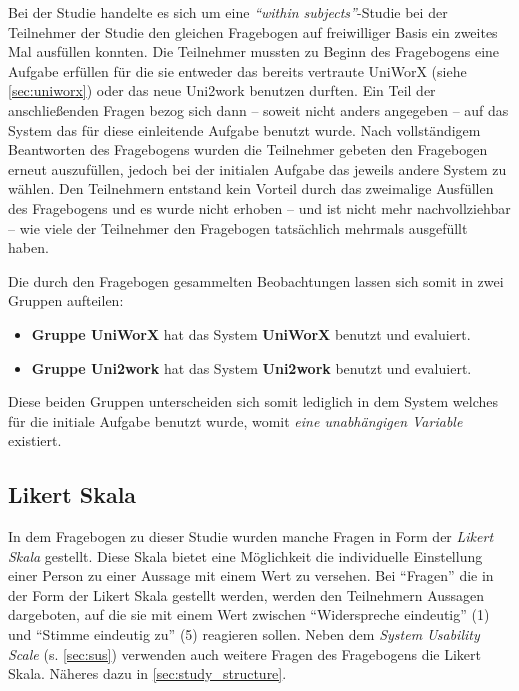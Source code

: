 \documentclass[11pt,a4paper,twoside,ngerman]{article}
\begin{document}
Bei der Studie handelte es sich um eine \emph{"`within subjects"'}-Studie bei der Teilnehmer der Studie den gleichen Fragebogen auf freiwilliger Basis ein zweites Mal ausfüllen konnten. Die Teilnehmer mussten zu Beginn des Fragebogens eine Aufgabe erfüllen für die sie entweder das bereits vertraute UniWorX (siehe \autoref{sec:uniworx}) oder das neue Uni2work benutzen durften. Ein Teil der anschließenden Fragen bezog sich dann -- soweit nicht anders angegeben -- auf das System das für diese einleitende Aufgabe benutzt wurde. Nach vollständigem Beantworten des Fragebogens wurden die Teilnehmer gebeten den Fragebogen erneut auszufüllen, jedoch bei der initialen Aufgabe das jeweils andere System zu wählen. Den Teilnehmern entstand kein Vorteil durch das zweimalige Ausfüllen des Fragebogens und es wurde nicht erhoben -- und ist nicht mehr nachvollziehbar -- wie viele der Teilnehmer den Fragebogen tatsächlich mehrmals ausgefüllt haben.

Die durch den Fragebogen gesammelten Beobachtungen lassen sich somit in zwei Gruppen aufteilen:

\begin{itemize}
    \item \textbf{Gruppe UniWorX} hat das System \textbf{UniWorX} benutzt und evaluiert.
    \item \textbf{Gruppe Uni2work} hat das System \textbf{Uni2work} benutzt und evaluiert.
\end{itemize}

Diese beiden Gruppen unterscheiden sich somit lediglich in dem System welches für die initiale Aufgabe benutzt wurde, womit \emph{eine unabhängigen Variable} existiert.

\subsection{Likert Skala} \label{sec:likert}
In dem Fragebogen zu dieser Studie wurden manche Fragen in Form der \emph{Likert Skala} gestellt.
Diese Skala bietet eine Möglichkeit die individuelle Einstellung einer Person zu einer Aussage mit einem Wert zu versehen. Bei "`Fragen"' die in der Form der Likert Skala gestellt werden, werden den Teilnehmern Aussagen dargeboten, auf die sie mit einem Wert zwischen "`Widerspreche eindeutig"' (1) und "`Stimme eindeutig zu"' (5) reagieren sollen. Neben dem \emph{System Usability Scale} (s. \autoref{sec:sus}) verwenden auch weitere Fragen des Fragebogens die Likert Skala. Näheres dazu in \autoref{sec:study_structure}.
\end{document}
